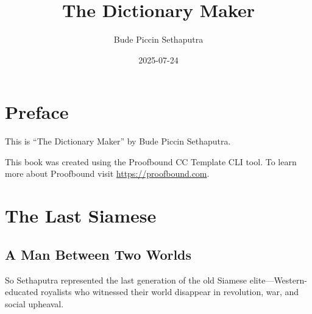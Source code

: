 \documentclass[
  Letterpaper,
]{scrbook}
\title{The Dictionary Maker}
\author{Bude Piccin Sethaputra}
\date{2025-07-24}
\renewcommand*\contentsname{Table of contents}
\newcommand\contentsname{Table of contents}
\begin{document}
\frontmatter
\maketitle

\renewcommand*\contentsname{Table of contents}
{
\setcounter{tocdepth}{1}
\tableofcontents
}

\mainmatter
{}

\chapter*{Preface}\label{preface}


This is ``The Dictionary Maker'' by Bude Piccin Sethaputra.

This book was created using the Proofbound CC Template CLI tool. To
learn more about Proofbound visit \url{https://proofbound.com}.


\chapter{The Last Siamese}\label{sec-last-siamese}

\section{A Man Between Two Worlds}\label{a-man-between-two-worlds}

So Sethaputra represented the last generation of the old Siamese
elite---Western-educated royalists who witnessed their world disappear
in revolution, war, and social upheaval.
\end{document}
